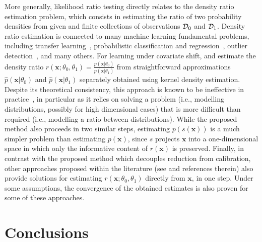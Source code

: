 \documentclass[12pt]{article}
\numberwithin{equation}{section}
\theoremstyle{plain}
\begin{document}
More generally, likelihood ratio testing directly relates to the density ratio
estimation problem, which consists in estimating the ratio of two probability
densities from given and finite collections of observations ${\cal D}_0$ and
${\cal D}_1$. Density ratio estimation is connected to many machine learning
fundamental problems, including transfer learning~\citep{sugiyama2012machine},
probabilistic classification and regression~\citep{vapnik1998statistical},
outlier detection~\citep{hido2011statistical}, and many others. For learning
under covariate shift, \cite{shimodaira2000improving} and \cite{sugiyama2005input} estimate
the density ratio $r(\mathbf{x};\theta_0,\theta_1) =
\frac{p(\mathbf{x}|\theta_0)}{p(\mathbf{x}|\theta_1)}$ from straightforward
approximations $\hat{p}(\mathbf{x}|\theta_0)$ and $\hat{p}(\mathbf{x}|\theta_1)$
separately obtained using kernel density estimation. Despite its theoretical
consistency, this approach is known to be ineffective in
practice~\citep{sugiyama2007covariate,bickel2009discriminative}, in particular
as it relies on solving a problem (i.e., modelling distributions, possibly for high dimensional cases) that is
more difficult than required (i.e., modelling a ratio between distributions).
While the proposed method also proceeds in two similar steps, estimating
$p(s(\mathbf{x}))$ is a much simpler problem than estimating $p(\mathbf{x})$,
since $s$ projects $\mathbf{x}$ into a one-dimensional space in which only
the informative content of $r(\mathbf{x})$ is preserved.
Finally, in contrast with the
proposed method which decouples reduction from calibration, other
approaches proposed within the literature (see
\cite{sugiyama2012density,gretton2009covariate,nguyen2010estimating,vapnik2013constructive}
and references therein) also provide solutions for estimating
$r(\mathbf{x};\theta_0,\theta_1)$ directly from $\mathbf{x}$, in one step. Under some
assumptions, the convergence of the obtained estimates is also proven for some
of these approaches.



\section{Conclusions}
\label{sec:conclusions}
\end{document}
